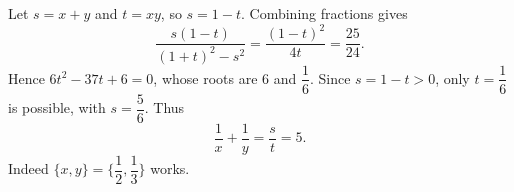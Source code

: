 Let $s=x+y$ and $t=xy$, so $s=1-t$. Combining fractions gives
\[
\dfrac{s(1-t)}{(1+t)^2-s^2}=\dfrac{(1-t)^2}{4t}=\dfrac{25}{24}.
\]
Hence $6t^2-37t+6=0$, whose roots are $6$ and $\dfrac{1}{6}$. Since $s=1-t>0$, only $t=\dfrac{1}{6}$ is possible, with $s=\dfrac{5}{6}$. Thus
\[
\boxed{\dfrac{1}{x}+\dfrac{1}{y}=\dfrac{s}{t}=5}.
\]
Indeed $\{x,y\}=\{\dfrac{1}{2},\dfrac{1}{3}\}$ works.
